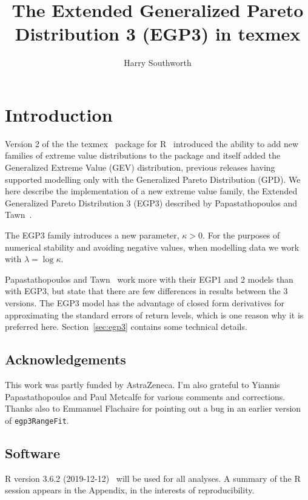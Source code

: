\documentclass[a4paper]{article}\usepackage[]{graphicx}\usepackage[]{color}
\begin{document}
\title{The Extended Generalized Pareto Distribution 3 (EGP3) in texmex}
\author{Harry Southworth}
\maketitle%
\tableofcontents
\clearpage



\section{Introduction}
Version 2 of the the texmex~\cite{texmex} package for R~\cite{R} introduced
the ability to add new families of extreme value distributions to the package
and itself added the Generalized Extreme Value (GEV) distribution, previous
releases having supported modelling only with the Generalized Pareto
Distribution (GPD). We here describe the implementation of a new extreme
value family, the Extended Generalized Pareto Distribution 3 (EGP3) described
by Papastathopoulos and Tawn~\cite{egp}.

The EGP3 family introduces a new parameter, $\kappa > 0$. For the purposes
of numerical stability and avoiding negative values, when modelling data we
work with $\lambda = \log\kappa$.

Papastathopoulos and Tawn~\cite{egp} work more with their EGP1 and 2 models
than with EGP3, but state that there are few differences in results between
the 3 versions. The EGP3 model has the advantage of closed form derivatives
for approximating the standard errors of return levels, which is
one reason why it is preferred here. Section~\ref{sec:egp3} contains some
technical details.

\subsection{Acknowledgements}
This work was partly funded by AstraZeneca. I'm also grateful to Yiannis
Papastathopoulos and Paul Metcalfe for various comments and corrections.
Thanks also to Emmanuel Flachaire for pointing out a bug in an earlier
version of {\tt egp3RangeFit}.

\subsection{Software}
R version 3.6.2 (2019-12-12)~\cite{R} will be used for all analyses.
A summary of the R session appears in the Appendix, in the interests of
reproducibility.
\end{document}
